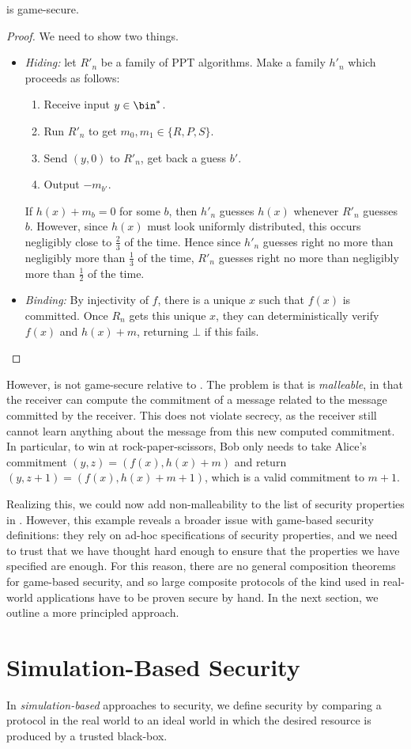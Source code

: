 \begin{prop}
	 is game-secure.
\end{prop}
\begin{proof}We need to show two things.
	\begin{itemize}
		\item \emph{Hiding:} let $R'_n$ be a family of PPT algorithms. Make a
		      family $h'_n$ which proceeds as follows:
		      \begin{enumerate}[itemsep=-0.2em]
			      \item Receive input $y\in\bin^*$.
			      \item Run $R'_n$ to get $m_0,m_1\in\{R,P,S\}$.
			      \item Send $(y, 0)$ to $R'_n$, get back a guess $b'$.
			      \item Output $-m_{b'}$.
		      \end{enumerate}

		      If $h(x) + m_b = 0$ for some $b$, then $h'_n$ guesses $h(x)$ whenever
		      $R'_n$ guesses $b$. However, since $h(x)$ must look uniformly
		      distributed, this occurs negligibly close to $\frac{2}{3}$ of the
		      time. Hence since $h'_n$ guesses right no more than negligibly more
		      than $\frac{1}{3}$ of the time, $R'_n$ guesses right no more than
		      negligibly more than $\frac{1}{2}$ of the time.
		\item \emph{Binding:} By injectivity of $f$, there is a unique $x$ such that
		      $f(x)$ is committed. Once $R_n$ gets this unique $x$, they can
		      deterministically verify $f(x)$ and $h(x)+m$, returning $\bot$ if this
		      fails. \qedhere
	\end{itemize}
\end{proof}

\noindent
However,  is not game-secure relative to
. The problem is that  is
\emph{malleable}, in that the receiver can compute the commitment of a message
related to the message committed by the receiver. This does not violate secrecy,
as the receiver still cannot learn anything about the message from this new
computed commitment. In particular, to win at rock-paper-scissors, Bob only
needs to take Alice's commitment $(y, z) = (f(x), h(x) + m)$ and return $(y,
	z+1) = (f(x), h(x) + m + 1)$, which is a valid commitment to $m+1$.

Realizing this, we could now add non-malleability to the list of security
properties in . However, this example reveals a
broader issue with game-based security definitions: they rely on ad-hoc
specifications of security properties, and we need to trust that we have thought
hard enough to ensure that the properties we have specified are enough. For this
reason, there are no general composition theorems for game-based security, and
so large composite protocols of the kind used in real-world applications have to
be proven secure by hand. In the next section, we outline a more principled
approach.


\section{Simulation-Based Security}

In \emph{simulation-based} approaches to security, we define security by
comparing a protocol in the real world to an ideal world in which the desired
resource is produced by a trusted black-box.

